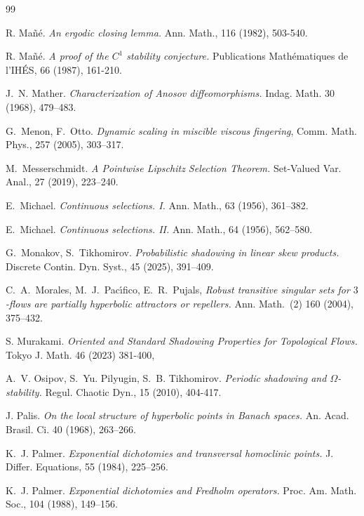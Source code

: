 \documentclass[12pt]{article}
\theoremstyle{definition}
\begin{document}
\begin{thebibliography}{99}
{ R. Mañé. \textit{An ergodic closing lemma.}  Ann. Math., 116 (1982), 503-540. 

 R. Mañé. \textit{A proof of the $C^1$ stability conjecture.} Publications Mathématiques de l’IHÉS, 66 (1987), 161-210. 

J.~N. Mather. \textit{Characterization of Anosov diffeomorphisms.}
Indag. Math. 30 (1968), 479--483.

G.~Menon, F.~Otto. {\em Dynamic scaling in miscible viscous fingering}, Comm. Math. Phys., 257 (2005), 303--317.

M.~Messerschmidt.
\newblock \textit{A Pointwise Lipschitz Selection Theorem.}
\newblock Set-Valued Var. Anal., 27 (2019), 223--240.

E.~Michael.
\newblock \textit{Continuous selections. I.}
\newblock Ann. Math., 63 (1956), 361--382.

E.~Michael.
\newblock \textit{Continuous selections. II.}
\newblock Ann. Math., 64 (1956), 562--580.

G.~Monakov, S.~Tikhomirov.
\newblock \textit{Probabilistic shadowing in linear skew products.}
\newblock Discrete Contin. Dyn. Syst., 45 (2025), 391--409.

C.~A.~Morales, M.~J.~Pac\'{\i}fico, E.~R.~Pujals,
\emph{Robust transitive singular sets for $3$-flows are partially hyperbolic attractors or repellers.}
Ann. Math.~(2) 160 (2004), 375--432.

S. Murakami. \textit{Oriented and Standard Shadowing Properties for Topological Flows.} Tokyo J. Math. 46 (2023) 381-400,

A.~V. Osipov, S.~Yu. Pilyugin,  S.~B. Tikhomirov.
\newblock \textit{Periodic shadowing and $\Omega$-stability.}
\newblock Regul. Chaotic Dyn., 15 (2010), 404-417.

J. Palis. 
\textit{On the local structure of hyperbolic points in Banach spaces.}
An. Acad. Brasil. Ci. 40 (1968), 263–266.

K.~J. Palmer.
\newblock \textit{Exponential dichotomies and transversal homoclinic points.}
\newblock J. Differ. Equations, 55 (1984), 225--256.

K.~J. Palmer.
\newblock \textit{Exponential dichotomies and Fredholm operators.}
\newblock Proc. Am. Math. Soc., 104 (1988), 149--156.

}
\end{thebibliography}
\end{document}
